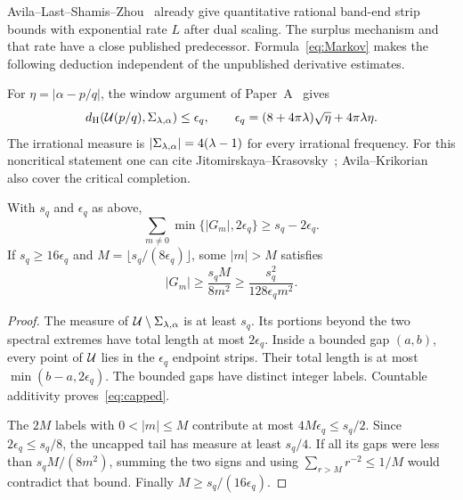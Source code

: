 Avila--Last--Shamis--Zhou~\cite[Proposition~5.1]{ALSZ} already give quantitative rational band-end strip bounds with exponential rate $L$ after dual scaling. The surplus mechanism and that rate have a close published predecessor. Formula~\eqref{eq:Markov} makes the following deduction independent of the unpublished derivative estimates.

For $\eta=|\alpha-p/q|$, the window argument of Paper~A~\cite[Lemmas~2.5--2.6]{PaperA} gives
\begin{equation}\label{eq:continuity}
 d_{\mathrm H}(\mathcal U(p/q),\Sigma_{\lambda,\alpha})\le\epsilon_q,
 \qquad \epsilon_q=(8+4\pi\lambda)\sqrt\eta+4\pi\lambda\eta.
\end{equation}
The irrational measure is $|\Sigma_{\lambda,\alpha}|=4(\lambda-1)$ for every irrational frequency. For this noncritical statement one can cite Jitomirskaya--Krasovsky~\cite[Theorem~2]{JKmeasure}; Avila--Krikorian~\cite{AKmeasure} also cover the critical completion.

\begin{proposition}\label{prop:capped}
With $s_q$ and $\epsilon_q$ as above,
\begin{equation}\label{eq:capped}
 \sum_{m\ne0}\min\{|G_m|,2\epsilon_q\}\ge s_q-2\epsilon_q.
\end{equation}
If $s_q\ge16\epsilon_q$ and $M=\lfloor s_q/(8\epsilon_q)\rfloor$, some $|m|>M$ satisfies
\begin{equation}\label{eq:pigeonhole}
 |G_m|\ge\frac{s_qM}{8m^2}
       \ge\frac{s_q^2}{128\epsilon_qm^2}.
\end{equation}
\end{proposition}
\begin{proof}
The measure of $\mathcal U\setminus\Sigma_{\lambda,\alpha}$ is at least $s_q$. Its portions beyond the two spectral extremes have total length at most $2\epsilon_q$. Inside a bounded gap $(a,b)$, every point of $\mathcal U$ lies in the $\epsilon_q$ endpoint strips. Their total length is at most $\min(b-a,2\epsilon_q)$. The bounded gaps have distinct integer labels. Countable additivity proves~\eqref{eq:capped}.

The $2M$ labels with $0<|m|\le M$ contribute at most $4M\epsilon_q\le s_q/2$. Since $2\epsilon_q\le s_q/8$, the uncapped tail has measure at least $s_q/4$. If all its gaps were less than $s_qM/(8m^2)$, summing the two signs and using $\sum_{r>M}r^{-2}\le1/M$ would contradict that bound. Finally $M\ge s_q/(16\epsilon_q)$.
\end{proof}


